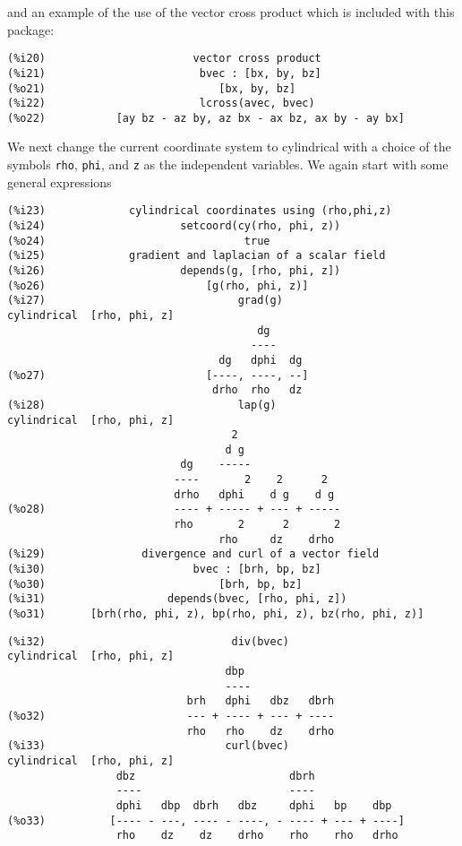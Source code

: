 \documentclass[12pt]{article}
\begin{document}
\normalsize
and an example of the use of the vector cross product which is included with this
  package:
\small
\begin{verbatim}
(%i20)                       vector cross product 
(%i21)                        bvec : [bx, by, bz]
(%o21)                           [bx, by, bz]
(%i22)                        lcross(avec, bvec)
(%o22)           [ay bz - az by, az bx - ax bz, ax by - ay bx]
\end{verbatim}
\normalsize
We next change the current coordinate system to cylindrical with a choice of
  the symbols \verb|rho|, \verb|phi|, and \verb|z| as the independent variables.
We again start with some general expressions
\small
\begin{verbatim}
(%i23)             cylindrical coordinates using (rho,phi,z) 
(%i24)                     setcoord(cy(rho, phi, z))
(%o24)                               true
(%i25)             gradient and laplacian of a scalar field 
(%i26)                     depends(g, [rho, phi, z])
(%o26)                         [g(rho, phi, z)]
(%i27)                              grad(g)
cylindrical  [rho, phi, z] 
                                       dg
                                      ----
                                 dg   dphi  dg
(%o27)                         [----, ----, --]
                                drho  rho   dz
(%i28)                              lap(g)
cylindrical  [rho, phi, z] 
                                   2
                                  d g
                           dg    -----
                          ----       2    2      2
                          drho   dphi    d g    d g
(%o28)                    ---- + ----- + --- + -----
                          rho       2      2       2
                                 rho     dz    drho
(%i29)               divergence and curl of a vector field
(%i30)                       bvec : [brh, bp, bz]
(%o30)                           [brh, bp, bz]
(%i31)                   depends(bvec, [rho, phi, z])
(%o31)       [brh(rho, phi, z), bp(rho, phi, z), bz(rho, phi, z)]
\end{verbatim}
\newpage
\begin{verbatim}
(%i32)                             div(bvec)
cylindrical  [rho, phi, z] 
                                  dbp
                                  ----
                            brh   dphi   dbz   dbrh
(%o32)                      --- + ---- + --- + ----
                            rho   rho    dz    drho
(%i33)                            curl(bvec)
cylindrical  [rho, phi, z] 
                 dbz                        dbrh
                 ----                       ----
                 dphi   dbp  dbrh   dbz     dphi   bp    dbp
(%o33)          [---- - ---, ---- - ----, - ---- + --- + ----]
                 rho    dz    dz    drho    rho    rho   drho
\end{verbatim}
\end{document}
